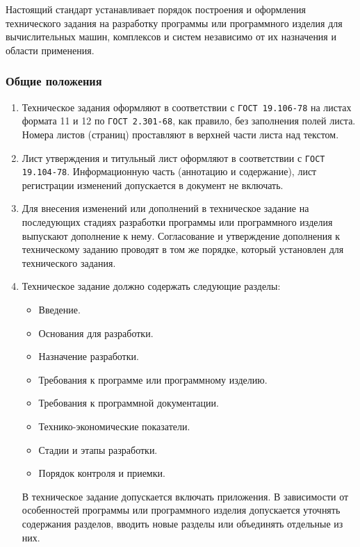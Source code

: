 \documentclass[a4paper, 14pt]{article}
\begin{document}
Настоящий стандарт устанавливает порядок построения и оформления технического задания на разработку программы или программного изделия для вычислительных машин, комплексов и систем независимо от их назначения и области применения.

\subsubsection{Общие положения}

\begin{enumerate}
    \item Техническое задания оформляют в соответствии с \texttt{ГОСТ 19.106-78} на листах формата 11 и 12 по \texttt{ГОСТ 2.301-68}, как правило, без заполнения полей листа. Номера листов (страниц) проставляют в верхней части листа над текстом.
    \item Лист утверждения и титульный лист оформляют в соответствии с \texttt{ГОСТ 19.104-78}. Информационную часть (аннотацию и содержание), лист регистрации изменений допускается в документ не включать.
    \item Для внесения изменений или дополнений в техническое задание на последующих стадиях разработки программы или программного изделия выпускают дополнение к нему. Согласование и утверждение дополнения к техническому заданию проводят в том же порядке, который установлен для технического задания.
    \item Техническое задание должно содержать следующие разделы:
    \begin{itemize}
        \item Введение.
        \item Основания для разработки.
        \item Назначение разработки.
        \item Требования к программе или программному изделию.
        \item Требования к программной документации.
        \item Технико-экономические показатели.
        \item Стадии и этапы разработки.
        \item Порядок контроля и приемки.
    \end{itemize}
    В техническое задание допускается включать приложения. В зависимости от особенностей программы или программного изделия допускается уточнять содержания разделов, вводить новые разделы или объединять отдельные из них.
\end{enumerate}
\end{document}
